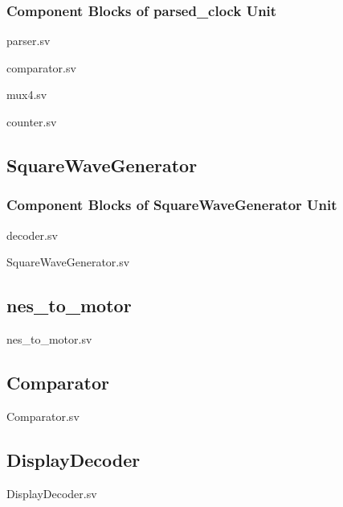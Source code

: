 \documentclass[a4paper]{article}
\begin{document}
\subsubsection{Component Blocks of parsed\_clock Unit}
parser.sv


comparator.sv


mux4.sv


counter.sv


\clearpage

\subsection{SquareWaveGenerator}
\subsubsection{Component Blocks of SquareWaveGenerator Unit}
decoder.sv


SquareWaveGenerator.sv


\clearpage

\subsection{nes\_to\_motor}
nes\_to\_motor.sv


\subsection{Comparator}
Comparator.sv


\subsection{DisplayDecoder}
DisplayDecoder.sv

\end{document}
